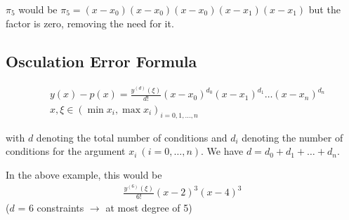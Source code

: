 $\pi_5$ would be $\pi_5 = (x-x_0)(x-x_0)(x-x_0)(x-x_1)(x-x_1)$ but the factor is zero, removing the need for it.

\subsection{Osculation Error Formula}

\begin{align*}
	\ & y(x)-p(x) = \frac{y^{(d)}(\xi)}{d!}(x-x_0)^{d_0}(x-x_1)^{d_1}\ldots(x-x_n)^{d_n} \\
	\ & x, \xi \in (\min x_i, \max x_i)_{i=0,1,\ldots,n}
\end{align*}

with $d$ denoting the total number of conditions and $d_i$ denoting the number of conditions for the argument $x_i\ (i=0,\ldots,n)$.
We have $d=d_0+d_1+\ldots+d_n$.

In the above example, this would be
\begin{align*}
	\frac{y^{(6)}(\xi)}{6!}(x-2)^3(x-4)^3
\end{align*}
($d$ = 6 constraints $\rightarrow$ at most degree of 5)
